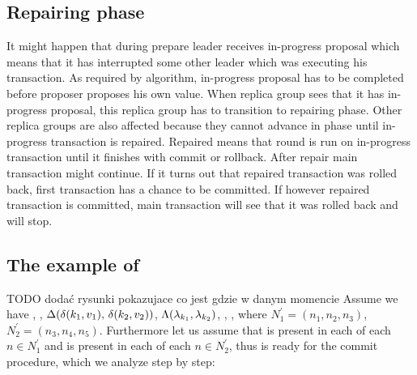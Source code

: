 \subsection{Repairing phase}
It might happen that during prepare leader receives in-progress proposal which means that it has interrupted some other leader which was executing his transaction. As required by \paxos algorithm, in-progress proposal has to be completed before proposer proposes his own value. When replica group sees that it has in-progress proposal, this replica group has to transition to repairing phase. 
Other replica groups are also affected because they cannot advance in phase until in-progress transaction is repaired. Repaired means that \mpt round is run on in-progress transaction until it finishes with commit or rollback. 
After repair main transaction might continue. If it turns out that repaired transaction was rolled back, first transaction has a chance to be committed. If however repaired transaction is committed, main transaction will see that it was rolled back and will stop.




\subsection{The example of \mpt}
TODO dodać rysunki pokazujace co jest gdzie w danym momencie
Assume we have 
, ,
$\text{$\Delta$}(\text{$\delta(k_1, v_1)$, $\delta(k_2, v_2)$})$, 
$\text{$\Lambda$}(\text{$\lambda_{k_1}$}, \text{$\lambda_{k_2}$})$,
, 
, 
where $N^'_1=(n_1, n_2, n_3)$, 
$N^'_2=(n_3,n_4,n_5)$. Furthermore let us assume that  is present in each \txStorage of each $n\in N^'_1$ and  is present in each \txStorage of each $n\in N^'_2$, thus \transaction is ready for the commit procedure, which we analyze step by step:

